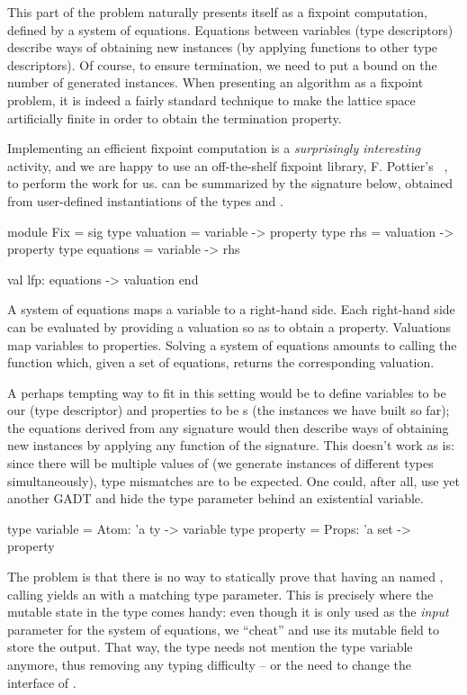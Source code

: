 This part of the problem naturally presents itself as a fixpoint computation,
defined by a system of equations. Equations between variables (type descriptors)
describe ways of obtaining new instances (by applying functions to other type
descriptors). Of course, to ensure termination, we need to put a bound on the
number of generated instances. When presenting an algorithm as a fixpoint
problem, it is indeed a fairly standard technique to make the lattice space
artificially finite in order to obtain the termination property.

Implementing an efficient fixpoint computation is a \emph{surprisingly
interesting} activity, and we are happy to use an off-the-shelf fixpoint
library, F. Pottier's ~\cite{fix},
to perform the work for us.  can be summarized by the signature
below, obtained from user-defined instantiations of the types 
and .
%
\begin{ocamlcode}
module Fix = sig
  type valuation = variable -> property
  type rhs = valuation -> property
  type equations = variable -> rhs

  val lfp: equations -> valuation
end
\end{ocamlcode}
%
A system of equations maps a variable to a right-hand side.  Each right-hand
side can be evaluated by providing a valuation so as to obtain a property.
Valuations map variables to properties. Solving a system of equations amounts to
calling the  function which, given a set of equations, returns the
corresponding valuation.

A perhaps tempting way to fit in this setting would be to define variables to be
our  (type descriptor) and properties to be s (the
instances we have built so far); the equations derived from any signature would
then describe ways of obtaining new instances by applying any function of the
signature. This doesn't work as is: since there will be multiple values of
 (we generate instances of different types simultaneously), type
mismatches are to be expected. One could, after all, use yet another GADT and
hide the  type parameter behind an existential variable.
%
\begin{ocamlcode}
  type variable = Atom: 'a ty -> variable
  type property = Props: 'a set -> property
\end{ocamlcode}
%
The problem is that there is no way to statically prove that having an
 named , calling  yields an
 with a matching type parameter. This is precisely
where the mutable state in the  type comes handy: even though it is
only used as the \emph{input} parameter for the system of equations, we
``cheat'' and use its mutable  field to store the output. That way,
the  type needs not mention the type variable  anymore,
thus removing any typing difficulty -- or the need to change the interface of
.


